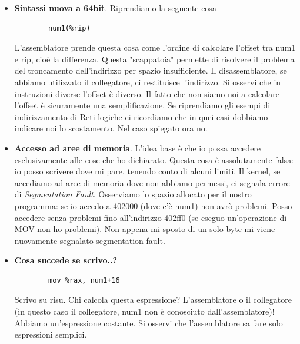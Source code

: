 \begin{itemize}
	\item \textbf{Sintassi nuova a 64bit}. Riprendiamo la seguente cosa
	\begin{verbatim}
		num1(%rip)
	\end{verbatim}
	L'assemblatore prende questa cosa come l'ordine di calcolare l'offset tra num1 e rip, cioè la differenza. Questa "scappatoia" permette di risolvere il problema del troncamento dell'indirizzo per spazio insufficiente. Il disassemblatore, se abbiamo utilizzato il collegatore, ci restituisce l'indirizzo. Si osservi che in instruzioni diverse l'offset è diverso. Il fatto che non siamo noi a calcolare l'offset è sicuramente una semplificazione. Se riprendiamo gli esempi di indirizzamento di Reti logiche ci ricordiamo che in quei casi dobbiamo indicare noi lo scostamento. Nel caso spiegato ora no.
	
	\item \textbf{Accesso ad aree di memoria}. L'idea base è che io possa accedere esclusivamente alle cose che ho dichiarato. Questa cosa è assolutamente falsa: io posso scrivere dove mi pare, tenendo conto di alcuni limiti. Il kernel, se accediamo ad aree di memoria dove non abbiamo permessi, ci segnala errore di \emph{Segmentation Fault}. Osserviamo lo spazio allocato per il nostro programma: se io accedo a 402000 (dove c'è num1) non avrò problemi. Posso accedere senza problemi fino all'indirizzo 402ff0 (se eseguo un'operazione di MOV non ho problemi). Non appena mi sposto di un solo byte mi viene nuovamente segnalato segmentation fault.
	\item \textbf{Cosa succede se scrivo..?}
	\begin{verbatim}
		mov %rax, num1+16
	\end{verbatim}
	Scrivo su risu. Chi calcola questa espressione? L'assemblatore o il collegatore (in questo caso il collegatore, num1 non è conosciuto dall'assemblatore)! Abbiamo un'espressione costante.
	Si osservi che l'assemblatore sa fare solo espressioni semplici.
\end{itemize}



